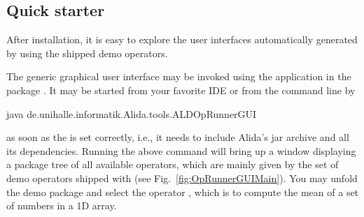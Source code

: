 \subsection{Quick starter}

After installation, it is easy to explore the user interfaces automatically
generated by \alida using the shipped demo operators.

The generic graphical user interface may be invoked using the application
 in the package
.
It may be started from your favorite IDE or from the command line by
\vspace*{0.5cm}
\begin{code}
        java de.unihalle.informatik.Alida.tools.ALDOpRunnerGUI
\end{code}

\vspace*{-0.25cm}
as soon as the  is set correctly, i.e., it needs to include
Alida's jar archive and all its dependencies. Running the above command will
bring up a window displaying a package tree of all available operators, which
are mainly given by the set of demo operators shipped with \alida (see
Fig.~\ref{fig:OpRunnerGUIMain}). You may unfold the demo package and select the
operator , which is to compute the mean of a set of
numbers in a 1D array.

